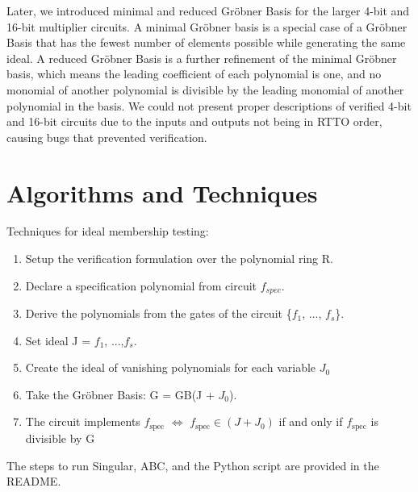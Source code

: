 \documentclass[conference]{IEEEtran}
\begin{document}
Later, we introduced minimal and reduced Gröbner Basis for the larger 4-bit and 16-bit multiplier circuits. 
A minimal Gröbner basis is a special case of a Gröbner Basis that has the fewest number of elements possible 
while generating the same ideal. A reduced Gröbner Basis is a further refinement of the minimal Gröbner basis,
which means the leading coefficient of each polynomial is one, and no monomial of another polynomial is divisible 
by the leading monomial of another polynomial in the basis. We could not present proper descriptions of verified
4-bit and 16-bit circuits due to the inputs and outputs not being in RTTO order, causing bugs that prevented verification.

\section{Algorithms and Techniques}
Techniques for ideal membership testing: 
\begin{enumerate}
    \item Setup the verification formulation over the polynomial ring R. 
    \item Declare a specification polynomial from circuit $f_{spec}$.
    \item Derive the polynomials from the gates of the circuit \{$f_{1}$, ..., $f_{s}$\}. 
    \item Set ideal J = $f_{1}$, ...,$f_{s}$.    
    \item Create the ideal of vanishing polynomials for each variable $J_{0}$
    \item Take the Gröbner Basis: G = GB(J + $J_{0}$).  
    \item The circuit implements \(f_{\text{spec}}\) \(\Longleftrightarrow\) \(f_{\text{spec}} \in (J + J_0)\) if and only if \(f_{\text{spec}}\)
    is divisible by G
\end{enumerate}
The steps to run Singular, ABC, and the Python script are provided in the README. 
\end{document}
